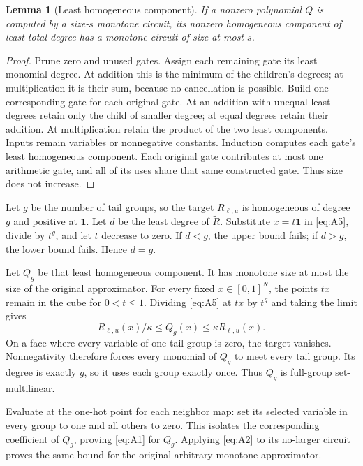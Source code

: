 \documentclass[11pt]{article}
\newtheorem{lemma}[theorem]{Lemma}
\theoremstyle{definition}
\theoremstyle{remark}
\numberwithin{equation}{section}
\begin{document}
\begin{lemma}[Least homogeneous component]\label{lem:least} If a nonzero polynomial \(Q\) is
computed by a size-\(s\) monotone circuit, its nonzero homogeneous
component of least total degree has a monotone circuit of size
at most \(s\).
\end{lemma}

\begin{proof} Prune zero and unused gates. Assign each remaining gate
its least monomial degree. At addition this is the minimum of
the children's degrees; at multiplication it is their sum,
because no cancellation is possible.
Build one corresponding gate for each original gate. At an
addition with unequal least degrees retain only the child of
smaller degree; at equal degrees retain their addition.
At multiplication retain the product of the two least components.
Inputs remain variables or nonnegative constants.
Induction computes each gate's least homogeneous component.
Each original gate contributes at most one arithmetic gate,
and all of its uses share that same constructed gate.
Thus size does not increase.\end{proof}

Let \(g\) be the number of tail groups, so the target
\(R_{\ell,u}\) is homogeneous of degree \(g\) and positive
at \(\mathbf1\). Let \(d\) be the least degree of
\(\widetilde R\). Substitute \(x=t\mathbf1\) in \eqref{eq:A5},
divide by \(t^g\), and let \(t\) decrease to zero.
If \(d<g\), the upper bound fails; if \(d>g\), the lower
bound fails. Hence \(d=g\).

Let \(Q_g\) be that least homogeneous component. It has
monotone size at most the size of the original approximator.
For every fixed \(x\in[0,1]^N\), the points \(tx\) remain
in the cube for \(0<t\le1\). Dividing \eqref{eq:A5} at \(tx\) by
\(t^g\) and taking the limit gives
\[
          R_{\ell,u}(x)/\kappa\le Q_g(x)\le\kappa R_{\ell,u}(x).
\]
On a face where every variable of one tail group is zero,
the target vanishes. Nonnegativity therefore forces every
monomial of \(Q_g\) to meet every tail group. Its degree is
exactly \(g\), so it uses each group exactly once.
Thus \(Q_g\) is full-group set-multilinear.

Evaluate at the one-hot point for each neighbor map: set
its selected variable in every group to one and all others
to zero. This isolates the corresponding coefficient of
\(Q_g\), proving \eqref{eq:A1} for \(Q_g\). Applying \eqref{eq:A2} to its
no-larger circuit proves the same bound for the original
arbitrary monotone approximator.
\end{document}

